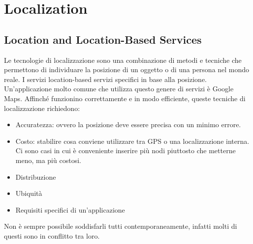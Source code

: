 
\newcommand{\tabitem}{~~\llap{\textbullet}~~}

% 
\chapter{Localization}\label{sec3}

\section{Location and Location-Based Services}\label{subsec3.1}
Le tecnologie di localizzazione sono una combinazione di metodi e
tecniche che permettono di individuare la posizione di un oggetto o di una
persona nel mondo reale. I servizi location-based servizi specifici in base alla
posizione. Un'applicazione molto comune che utilizza questo genere di servizi è
Google Maps.
Affinché funzionino correttamente e in modo efficiente, queste tecniche
di localizzazione richiedono:
        \begin{itemize}
                \item Accuratezza: ovvero la posizione deve essere precisa con
un minimo errore.
                \item Costo: stabilire cosa conviene utilizzare tra GPS o una
localizzazione interna. Ci sono casi in cui è conveniente inserire più nodi
piuttosto che metterne meno, ma più costosi.
                \item Distribuzione
                \item Ubiquità
                \item Requisiti specifici di un'applicazione
        \end{itemize}
        Non è sempre possibile soddisfarli tutti contemporaneamente, infatti
molti di questi sono in conflitto tra loro.

